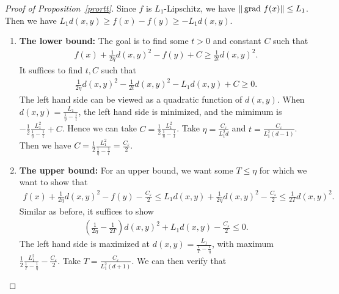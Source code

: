 \begin{proof}[Proof of Proposition~\ref{prortt}]    Since $f$ is $L_{1}$-Lipschitz, we have $\|\operatorname{grad\,} f(x)\| \le L_{1}$. 
    Then we have $L_{1} d(x, y) \ge f(x) - f(y) \ge -L_{1} d(x, y)$.

    \begin{enumerate}
        \item \textbf{The lower bound: } The goal is to find some $t > 0$ and constant $C$ such that 
        \begin{align*}
            f(x) + \frac{1}{2\eta} d(x, y)^{2} - f(y) + C \ge \frac{1}{2t} d(x, y)^{2}.
        \end{align*} 
        It suffices to find $t, C$ such that
        \begin{align*}
            \frac{1}{2\eta} d(x, y)^{2} - \frac{1}{2t} d(x, y)^{2} - L_{1} d(x, y) + C \ge 0.
        \end{align*}
        The left hand side can be viewed as a quadratic function of $d(x, y)$. 
        When $d(x, y) = \frac{L_{1}}{\frac{1}{\eta} - \frac{1}{t}}$, 
        the left hand side is minimized, and the mimimum is 
        $- \frac{1}{2}\frac{L_{1}^{2}}{\frac{1}{\eta} - \frac{1}{t}} + C$.
        Hence we can take $C = \frac{1}{2}\frac{L_{1}^{2}}{\frac{1}{\eta} - \frac{1}{t}}$. Take $\eta = \frac{C_{\varepsilon}}{L_{1}^{2} d}$ and $t = \frac{C_{\varepsilon}}{L_{1}^{2} (d-1)}$.
        Then we have $C = \frac{1}{2}\frac{L_{1}^{2}}{\frac{1}{\eta} - \frac{1}{t}} = \frac{C_{\varepsilon}}{2}$.    
        \item \textbf{The upper bound: } For an upper bound, we want some $T \le \eta$ for which we want to  show that
        \begin{align*}
            f(x) + \frac{1}{2\eta} d(x, y)^{2} - f(y) - \frac{C_{\varepsilon}}{2}
            \le L_{1} d(x, y) + \frac{1}{2\eta} d(x, y)^{2} - \frac{C_{\varepsilon}}{2}
            \le \frac{1}{2T} d(x, y)^{2}.
        \end{align*}
        Similar as before, it suffices to show 
        \begin{align*}
            (\frac{1}{2\eta} - \frac{1}{2T}) d(x, y)^{2} + L_{1} d(x, y) - \frac{C_{\varepsilon}}{2} 
            \le 0.
        \end{align*}
        The left hand side is maximized at $d(x, y) = \frac{L_{1}}{\frac{1}{T} - \frac{1}{\eta}}$, 
        with maximum $\frac{1}{2} \frac{L_{1}^{2}}{\frac{1}{T} - \frac{1}{\eta}} - \frac{C_{\varepsilon}}{2} $.
        Take $T = \frac{C_{\varepsilon}}{L_{1}^{2}(d+1)}$. We can then verify that 

\end{enumerate}
\end{proof}
